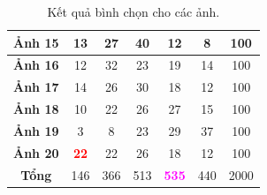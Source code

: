 \documentclass[a4paper, 12pt]{report}
\begin{document}
\begin{table}[h!]
\begin{tabular}{|c|c|c|c|c|c|c|}
\textbf{Ảnh 15}  & 13         & 27         & \textcolor{TealBlue}{\textbf{40}}         & 12         & 8          & 100         \\ \hline
\textbf{Ảnh 16}  & 12         & 32         & 23         & 19         & 14         & 100         \\ \hline
\textbf{Ảnh 17}  & 14         & 26         & 30         & 18         & 12         & 100         \\ \hline
\textbf{Ảnh 18}  & 10         & 22         & 26         & 27         & 15         & 100         \\ \hline
\textbf{Ảnh 19}  & 3          & 8          & 23         & 29         & 37         & 100         \\ \hline
\textbf{Ảnh 20}  & \textcolor{red}{\textbf{22}}         & 22         & 26         & 18         & 12         & 100         \\ \hline
\textbf{Tổng}  & 146         & 366         & 513         & \textcolor{Fuchsia}{\textbf{535}}         & 440      & 2000        \\ \hline
\end{tabular}
\caption{Kết quả bình chọn cho các ảnh.}
\label{tab:surveyresults}
\end{table}
\end{document}
